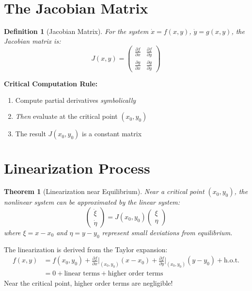 \documentclass[12pt]{article}
\newtheorem{definition}{Definition}
\newtheorem{theorem}{Theorem}
\begin{document}
\section{The Jacobian Matrix}

\begin{definition}[Jacobian Matrix]
For the system $\dot{x} = f(x,y)$, $\dot{y} = g(x,y)$, the Jacobian matrix is:
$$J(x,y) = \begin{pmatrix}
\frac{\partial f}{\partial x} & \frac{\partial f}{\partial y} \\[8pt]
\frac{\partial g}{\partial x} & \frac{\partial g}{\partial y}
\end{pmatrix}$$
\end{definition}

\begin{jacobian}
\textbf{Critical Computation Rule:}
\begin{enumerate}
    \item Compute partial derivatives \textit{symbolically}
    \item \textit{Then} evaluate at the critical point $(x_0, y_0)$
    \item The result $J(x_0, y_0)$ is a constant matrix
\end{enumerate}
\end{jacobian}

\section{Linearization Process}

\begin{theorem}[Linearization near Equilibrium]
Near a critical point $(x_0, y_0)$, the nonlinear system can be approximated by the linear system:
$$\begin{pmatrix} \dot{\xi} \\ \dot{\eta} \end{pmatrix} = J(x_0, y_0) \begin{pmatrix} \xi \\ \eta \end{pmatrix}$$
where $\xi = x - x_0$ and $\eta = y - y_0$ represent small deviations from equilibrium.
\end{theorem}

\begin{insight}
The linearization is derived from the Taylor expansion:
\begin{align}
f(x,y) &= f(x_0,y_0) + \frac{\partial f}{\partial x}\bigg|_{(x_0,y_0)}(x-x_0) + \frac{\partial f}{\partial y}\bigg|_{(x_0,y_0)}(y-y_0) + \text{h.o.t.} \\
&= 0 + \text{linear terms} + \text{higher order terms}
\end{align}
Near the critical point, higher order terms are negligible!
\end{insight}
\end{document}
